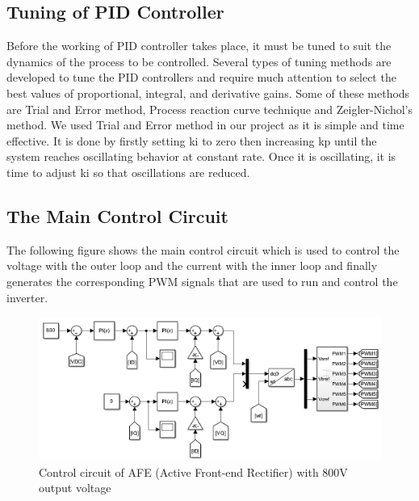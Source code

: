 \documentclass[12pt,a4paper]{book}
\begin{document}
\subsection{Tuning of PID Controller}
Before the working of PID controller takes place, it must be tuned to suit the dynamics of the process to be controlled. Several types of tuning methods are developed to tune the PID controllers and require much attention to select the best values of proportional, integral, and derivative gains. Some of these methods are Trial and Error method, Process reaction curve technique and Zeigler-Nichol’s method. We used Trial and Error method in our project as it is simple and time effective. It is done by firstly setting ki to zero then increasing kp until the system reaches oscillating behavior at constant rate. Once it is oscillating, it is time to adjust ki so that oscillations are reduced.

\subsection{The Main Control Circuit}
The following figure shows the main control circuit which is used to control the voltage with the outer loop and the current with the inner loop and finally generates the corresponding PWM signals that are used to run and control the inverter.

\begin{figure}[h]
  \centering
  \includegraphics[width=15cm]{image12.png}
  \caption{Control circuit of AFE (Active Front-end Rectifier) with 800V output voltage}
  \label{fig:image12}
\end{figure}
\end{document}
